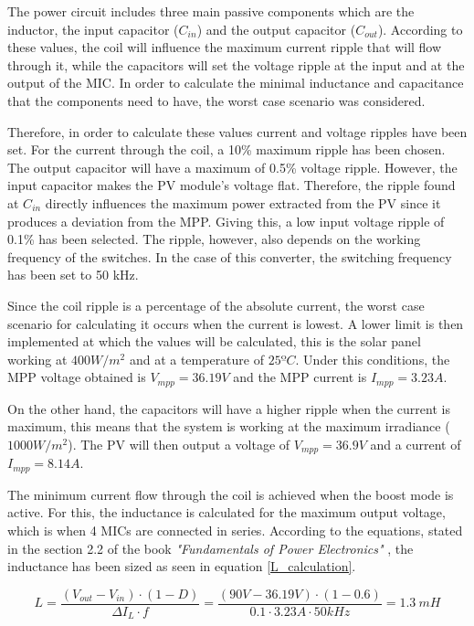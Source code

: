 The power circuit includes three main passive components which are the inductor, the input capacitor ($C_{in}$) and the output capacitor ($C_{out}$). According to these values, the coil will influence the maximum current ripple that will flow through it, while the capacitors will set the voltage ripple at the input and at the output of the MIC. In order to calculate the minimal inductance and capacitance that the components need to have, the worst case scenario was considered.

Therefore, in order to calculate these values current and voltage ripples have been set. For the current through the coil, a 10\% maximum ripple has been chosen. The output capacitor will  have a maximum of 0.5\% voltage ripple. However, the input capacitor makes the PV module's voltage flat. Therefore, the ripple found at $C_{in}$ directly influences the maximum power extracted from the PV since it produces a deviation from the MPP. Giving this, a low input voltage ripple of 0.1\% has been selected. The ripple, however, also depends on the working frequency of the switches. In the case of this converter, the switching frequency has been set to 50 kHz. 

Since the coil ripple is a percentage of the absolute current, the worst case scenario for calculating it occurs when the current is lowest. A lower limit is then implemented at which the values will be calculated, this is the solar panel working at $400 W/m^2$ and at a temperature of $25 ºC$. Under this conditions, the MPP voltage obtained is $V_{mpp} = 36.19 V$ and the MPP current is $I_{mpp} = 3.23A$.

On the other hand, the capacitors will have a higher ripple when the current is maximum, this means that the system is working at the maximum irradiance ($1000 W/m^2$). The PV will then output a voltage of $V_{mpp} = 36.9 V$ and a current of $I_{mpp} = 8.14 A$.

The minimum current flow through the coil is achieved when the boost mode is active. For this, the inductance is calculated for the maximum output voltage, which is when 4 MICs are connected in series. According to the equations, stated in the section 2.2 of the book \textit{"Fundamentals of Power Electronics"} \cite{Erickson}, the inductance has been sized as seen in equation \ref{L_calculation}.

\begin{equation} \label{L_calculation}
L = \frac{(V_{out} - V_{in}) \cdot (1-D)}{\Delta I_{L} \cdot f} = \frac{(90 V - 36.19 V) \cdot (1-0.6)}{0.1 \cdot 3.23 A \cdot 50 kHz} = 1.3 \ mH
\end{equation}

